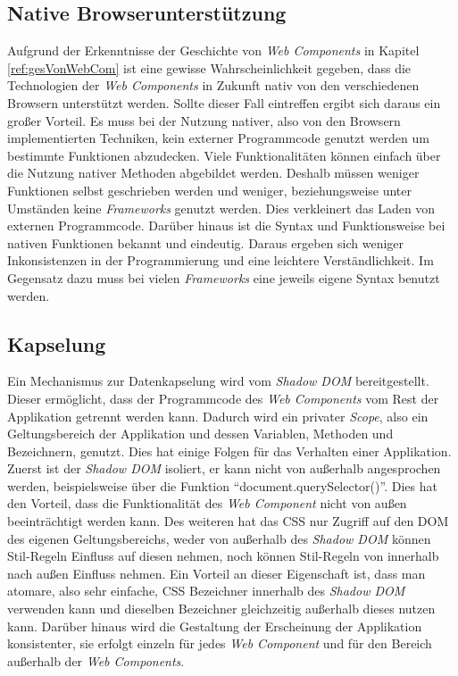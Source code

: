 \documentclass[12pt, paper=a4, bibtotoc, toc=listof, headsepline=true]{scrreprt}
\begin{document}
			\subsection{Native Browserunterstützung}
			Aufgrund der Erkenntnisse der Geschichte von \emph{Web Components} in Kapitel \ref{ref:gesVonWebCom} ist eine gewisse Wahrscheinlichkeit gegeben, dass die Technologien der \emph{Web Components} in Zukunft nativ von den verschiedenen Browsern unterstützt werden.
			Sollte dieser Fall eintreffen ergibt sich daraus ein großer Vorteil. Es muss bei der Nutzung nativer, also von den Browsern implementierten Techniken, kein externer Programmcode genutzt werden um bestimmte Funktionen abzudecken. Viele Funktionalitäten können einfach über die Nutzung nativer Methoden abgebildet werden. Deshalb müssen weniger Funktionen selbst geschrieben werden und weniger, beziehungsweise unter Umständen keine \emph{Frameworks} genutzt werden. Dies verkleinert das Laden von externen Programmcode. Darüber hinaus ist die Syntax und Funktionsweise bei nativen Funktionen bekannt und eindeutig. Daraus ergeben sich weniger Inkonsistenzen in der Programmierung und eine leichtere Verständlichkeit. Im Gegensatz dazu muss bei vielen \emph{Frameworks} eine jeweils eigene Syntax benutzt werden.
			\subsection{Kapselung}
			Ein Mechanismus zur Datenkapselung wird vom \emph{Shadow DOM} bereitgestellt.
			Dieser ermöglicht, dass der Programmcode des \emph{Web Components} vom Rest der Applikation getrennt werden kann. Dadurch wird ein privater \emph{Scope}, also ein Geltungsbereich der Applikation und dessen Variablen, Methoden und Bezeichnern, genutzt.\cite[vgl. S.2]{patel2015learning} Dies hat einige Folgen für das Verhalten einer Applikation. Zuerst ist der \emph{Shadow \ac{DOM}} isoliert, er kann nicht von außerhalb angesprochen werden, beispielsweise über die Funktion \enquote{document.querySelector()}. Dies hat den Vorteil, dass die Funktionalität des \emph{Web Component} nicht von außen beeinträchtigt werden kann. Des weiteren hat das \ac{CSS} nur Zugriff auf den \ac{DOM} des eigenen Geltungsbereichs, weder von außerhalb des \emph{Shadow \ac{DOM}} können Stil-Regeln Einfluss auf diesen nehmen, noch können Stil-Regeln von innerhalb nach außen Einfluss nehmen. Ein Vorteil an dieser Eigenschaft ist, dass man atomare, also sehr einfache, \ac{CSS} Bezeichner innerhalb des \emph{Shadow \ac{DOM}} verwenden kann und dieselben Bezeichner gleichzeitig außerhalb dieses nutzen kann.\cite[vgl.]{Bidelman2016} Darüber hinaus wird die Gestaltung der Erscheinung der Applikation konsistenter, sie erfolgt einzeln für jedes \emph{Web Component} und für den Bereich außerhalb der \emph{Web Components}.
\end{document}
